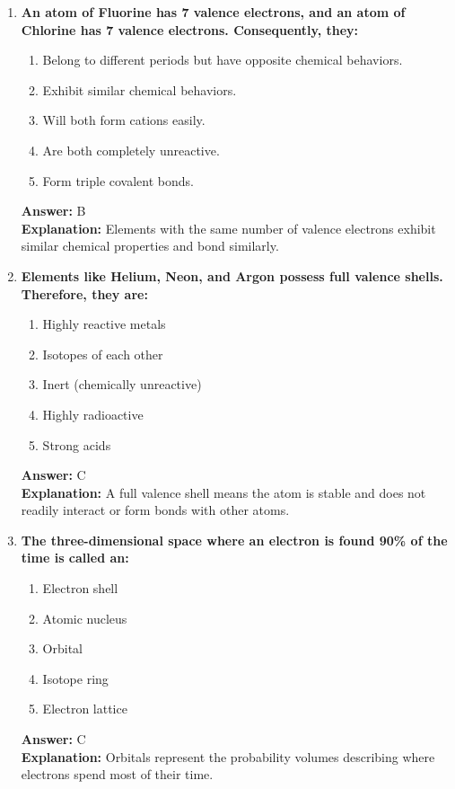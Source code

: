 \documentclass[11pt, a4paper]{article}
\begin{document}
\begin{enumerate}
\item \textbf{An atom of Fluorine has 7 valence electrons, and an atom of Chlorine has 7 valence electrons. Consequently, they:}
\begin{enumerate}[label=\Alph*.]
    \item Belong to different periods but have opposite chemical behaviors.
    \item Exhibit similar chemical behaviors.
    \item Will both form cations easily.
    \item Are both completely unreactive.
    \item Form triple covalent bonds.
\end{enumerate}
\textbf{Answer:} B \\
\textbf{Explanation:} Elements with the same number of valence electrons exhibit similar chemical properties and bond similarly.

\item \textbf{Elements like Helium, Neon, and Argon possess full valence shells. Therefore, they are:}
\begin{enumerate}[label=\Alph*.]
    \item Highly reactive metals
    \item Isotopes of each other
    \item Inert (chemically unreactive)
    \item Highly radioactive
    \item Strong acids
\end{enumerate}
\textbf{Answer:} C \\
\textbf{Explanation:} A full valence shell means the atom is stable and does not readily interact or form bonds with other atoms.

\item \textbf{The three-dimensional space where an electron is found 90\% of the time is called an:}
\begin{enumerate}[label=\Alph*.]
    \item Electron shell
    \item Atomic nucleus
    \item Orbital
    \item Isotope ring
    \item Electron lattice
\end{enumerate}
\textbf{Answer:} C \\
\textbf{Explanation:} Orbitals represent the probability volumes describing where electrons spend most of their time.


\end{enumerate}
\end{document}
